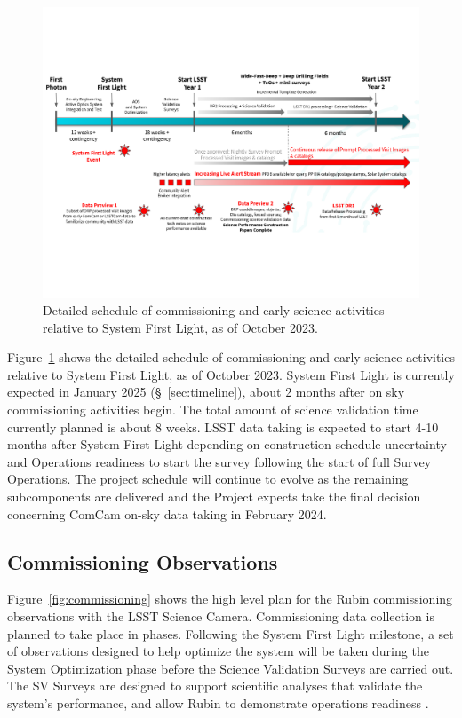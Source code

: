 \begin{figure}[htb]
\centering
\includegraphics[width=0.98\linewidth]{figures/rubinobs_on-sky_commissioning_and_early_science.pdf}
\caption{Detailed schedule of commissioning  and early science activities relative to System First Light, as of October 2023.}
\label{fig:commissioning-es-schedule}
\vspace{0.1cm}
\end{figure}

Figure~\ref{fig:commissioning-es-schedule} shows the detailed schedule of commissioning and early science activities relative to System First Light, as of October 2023.
System First Light is currently expected in January 2025 (\S~\ref{sec:timeline}), about 2 months after on sky commissioning activities begin.
The total amount of science validation time currently planned is about 8 weeks.  
LSST data taking is expected to start 4-10 months after System First Light depending on construction schedule uncertainty and Operations readiness to start the survey following the start of full Survey Operations.
The project schedule will continue to evolve as the remaining subcomponents are delivered and the Project expects take the final decision concerning ComCam on-sky data taking in February 2024.

\subsection{Commissioning Observations}
\label{ssec:commissioning-observations}

Figure~\ref{fig:commissioning} shows the high level plan for the Rubin commissioning observations with the LSST Science Camera.
Commissioning data collection is planned to take place in phases.
Following the System First Light milestone, a set of observations designed to help optimize the system will be taken during the System Optimization phase before the Science Validation Surveys are carried out. 
The SV Surveys are designed to support scientific analyses that validate the system's performance, and allow Rubin to demonstrate operations readiness .

